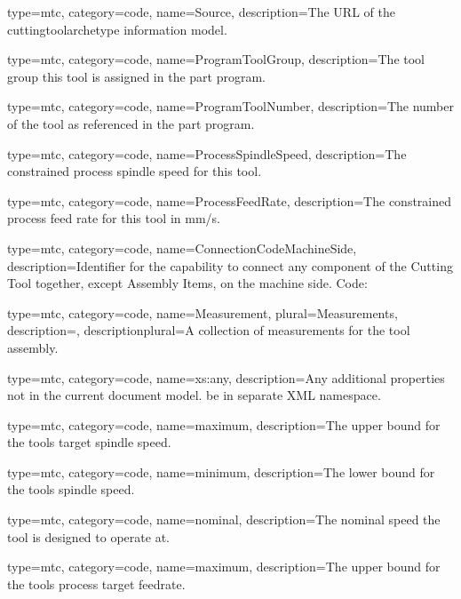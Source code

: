 {
  type=mtc,
  category=code,
  name={Source},
  description={The URL of the \gls{cuttingtoolarchetype} \gls{information model}.}
}


{
  type=mtc,
  category=code,
  name={ProgramToolGroup},
  description={The tool group this tool is assigned in the part program.}
}


{
  type=mtc,
  category=code,
  name={ProgramToolNumber},
  description={The number of the tool as referenced in the part program.}
}


{
  type=mtc,
  category=code,
  name={ProcessSpindleSpeed},
  description={The constrained process spindle speed for this tool.}
}


{
  type=mtc,
  category=code,
  name={ProcessFeedRate},
  description={The constrained process feed rate for this tool in mm/s.}
}


{
  type=mtc,
  category=code,
  name={ConnectionCodeMachineSide},
  description={Identifier for the capability to connect any component of the Cutting Tool together, except Assembly Items, on the machine side. Code: }
}


{
  type=mtc,
  category=code,
  name={Measurement},
  plural={Measurements},
  description={},
  descriptionplural={A collection of measurements for the tool assembly.}
}


{
  type=mtc,
  category=code,
  name={xs:any},
  description={Any additional properties not in the current document model. \MUST be in separate XML namespace.}
}


{
  type=mtc,
  category=code,
  name={maximum},
  description={The upper bound for the tools target spindle speed.}
}


{
  type=mtc,
  category=code,
  name={minimum},
  description={The lower bound for the tools spindle speed.}
}


{
  type=mtc,
  category=code,
  name={nominal},
  description={The nominal speed the tool is designed to operate at.}
}


{
  type=mtc,
  category=code,
  name={maximum},
  description={The upper bound for the tools process target feedrate.}
}


